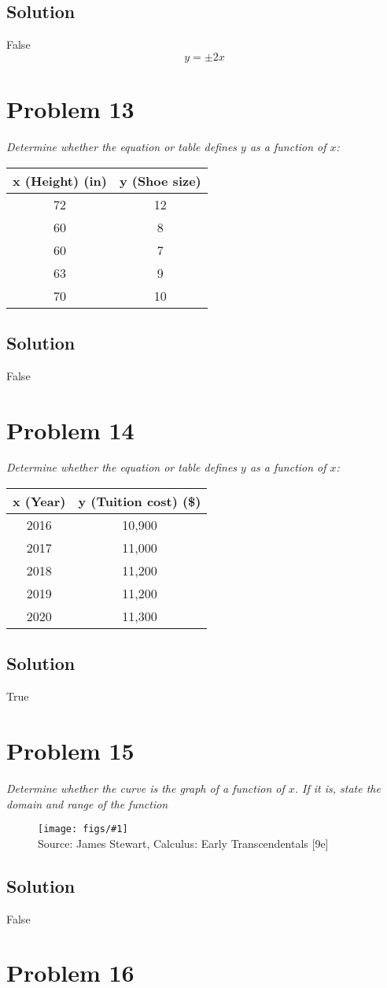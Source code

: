 \documentclass[11pt]{article}
\newcommand{\soln}{\subsection*}
\newcommand{\qn}{\textit}
\newcommand{\imagesource}[1]{{\footnotesize Source: #1}}
\newcommand{\img}[1]{
	\begin{figure}[h]
		\centering
		\texttt{[image: figs/\#1]}\\
		\imagesource{James Stewart, Calculus: Early Transcendentals [9e]}
	\end{figure}
}
\begin{document}
\soln{Solution}
False
$$y=\pm2x$$

\section*{Problem 13}

\qn{Determine whether the equation or table defines $y$ as a function of $x$:}

\begin{tabular}{|c|c|}
	\hline
	x (Height) (in) & y (Shoe size) \\
	\hline
	72 & 12 \\
	\hline
	60 & 8 \\
	\hline
	60 & 7 \\
	\hline
	63 & 9 \\
	\hline
	70 & 10 \\
	\hline
\end{tabular}

\soln{Solution}
False

\section*{Problem 14}

\qn{Determine whether the equation or table defines $y$ as a function of $x$:}

\begin{tabular}{|c|c|}
	\hline
	x (Year) & y (Tuition cost) (\$) \\
	\hline
	2016 & 10,900 \\
	\hline
	2017 & 11,000 \\
	\hline
	2018 & 11,200 \\
	\hline
	2019 & 11,200 \\
	\hline
	2020 & 11,300 \\
	\hline
\end{tabular}

\soln{Solution}
True

\section*{Problem 15}

\qn{Determine whether the curve is the graph of a function of $x$. If it is, state the domain and range of the function}

\img{1.1.15}

\soln{Solution}
False

\section*{Problem 16}
\end{document}
